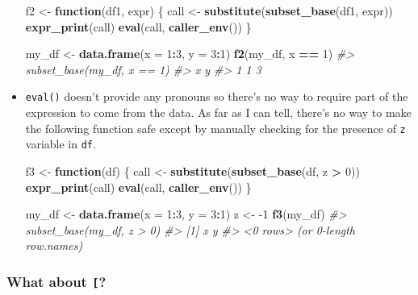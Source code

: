 \documentclass[]{book}
\newenvironment{Shaded}{\begin{snugshade}}{\end{snugshade}}
\newcommand{\CommentTok}[1]{\textcolor[rgb]{0.37,0.37,0.37}{\textit{#1}}}
\newcommand{\ControlFlowTok}[1]{\textcolor[rgb]{0.27,0.27,0.27}{\textbf{#1}}}
\newcommand{\DataTypeTok}[1]{\textcolor[rgb]{0.27,0.27,0.27}{#1}}
\newcommand{\DecValTok}[1]{\textcolor[rgb]{0.06,0.06,0.06}{#1}}
\newcommand{\KeywordTok}[1]{\textcolor[rgb]{0.27,0.27,0.27}{\textbf{#1}}}
\newcommand{\NormalTok}[1]{#1}
\newcommand{\OperatorTok}[1]{\textcolor[rgb]{0.43,0.43,0.43}{\textbf{#1}}}
\newcommand{\StringTok}[1]{\textcolor[rgb]{0.5,0.5,0.5}{#1}}
\begin{document}
\begin{itemize}
\begin{Shaded}
\begin{Highlighting}[]
\NormalTok{f2 <-}\StringTok{ }\ControlFlowTok{function}\NormalTok{(df1, expr) \{}
\NormalTok{  call <-}\StringTok{ }\KeywordTok{substitute}\NormalTok{(}\KeywordTok{subset_base}\NormalTok{(df1, expr))}
  \KeywordTok{expr_print}\NormalTok{(call)}
  \KeywordTok{eval}\NormalTok{(call, }\KeywordTok{caller_env}\NormalTok{())}
\NormalTok{\}}

\NormalTok{my_df <-}\StringTok{ }\KeywordTok{data.frame}\NormalTok{(}\DataTypeTok{x =} \DecValTok{1}\OperatorTok{:}\DecValTok{3}\NormalTok{, }\DataTypeTok{y =} \DecValTok{3}\OperatorTok{:}\DecValTok{1}\NormalTok{)}
\KeywordTok{f2}\NormalTok{(my_df, x }\OperatorTok{==}\StringTok{ }\DecValTok{1}\NormalTok{)}
\CommentTok{#> subset_base(my_df, x == 1)}
\CommentTok{#>   x y}
\CommentTok{#> 1 1 3}
\end{Highlighting}
\end{Shaded}
\item
  \texttt{eval()} doesn't provide any pronouns so there's no way to require part of
  the expression to come from the data. As far as I can tell, there's no
  way to make the following function safe except by manually checking for the
  presence of \texttt{z} variable in \texttt{df}.

\begin{Shaded}
\begin{Highlighting}[]
\NormalTok{f3 <-}\StringTok{ }\ControlFlowTok{function}\NormalTok{(df) \{}
\NormalTok{  call <-}\StringTok{ }\KeywordTok{substitute}\NormalTok{(}\KeywordTok{subset_base}\NormalTok{(df, z }\OperatorTok{>}\StringTok{ }\DecValTok{0}\NormalTok{))}
  \KeywordTok{expr_print}\NormalTok{(call)}
  \KeywordTok{eval}\NormalTok{(call, }\KeywordTok{caller_env}\NormalTok{())}
\NormalTok{\}}

\NormalTok{my_df <-}\StringTok{ }\KeywordTok{data.frame}\NormalTok{(}\DataTypeTok{x =} \DecValTok{1}\OperatorTok{:}\DecValTok{3}\NormalTok{, }\DataTypeTok{y =} \DecValTok{3}\OperatorTok{:}\DecValTok{1}\NormalTok{)}
\NormalTok{z <-}\StringTok{ }\DecValTok{-1}
\KeywordTok{f3}\NormalTok{(my_df)}
\CommentTok{#> subset_base(my_df, z > 0)}
\CommentTok{#> [1] x y}
\CommentTok{#> <0 rows> (or 0-length row.names)}
\end{Highlighting}
\end{Shaded}
\end{itemize}

\hypertarget{what-about}{%
\subsubsection{\texorpdfstring{What about \texttt{{[}}?}{What about {[}?}}\label{what-about}}
\end{document}
